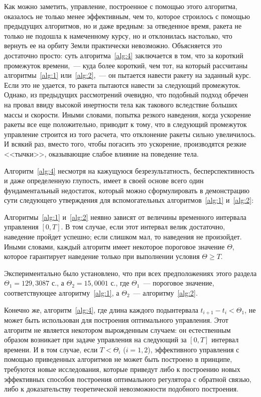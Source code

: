 Как можно заметить, управление, построенное с помощью этого алгоритма, оказалось не только менее эффективным, чем то, которое строилось с помощью предыдущих алгоритмов, но и даже вредным: за отведенное время, ракета не только не подошла к намеченному курсу, но и отклонилась настолько, что вернуть ее на орбиту Земли практически невозможно. Объясняется это достаточно просто: суть алгоритма~\ref{alg:4} заключается в том, что за короткий промежуток времени,~--- куда более короткий, чем тот, на который рассчитаны алгоритмы~\ref{alg:1} или~\ref{alg:2},~--- он пытается навести ракету на заданный курс. Если это не удается, то ракета пытаются навести за следующий промежуток. Однако, из предыдущих рассмотрений очевидно, что подобный подход обречен на провал ввиду высокой инертности тела как такового вследствие больших массы и скорости. Иными словами, попытка резкого наведения, когда ускорение ракеты все еще положительно, приводит к тому, что в следующий промежуток управление строится из того расчета, что отклонение ракеты сильно увеличилось. И всякий раз, вместо того, чтобы погасить это ускорение, производятся резкие <<тычки>>, оказывающие слабое влияние на поведение тела.

Алгоритм~\ref{alg:4} несмотря на кажущуюся безрезультатность, бесперспективность и даже определенную глупость, имеет в своей основе всего один фундаментальный недостаток, который можно сформулировать в демонстрацию сути следующего утверждения для вспомогательных алгоритмов~\ref{alg:1} и~\ref{alg:2}:

\begin{statement}
    Алгоритмы~\ref{alg:1} и~\ref{alg:2} неявно зависят от величины временного интервала управления $[0,T]$. В том случае, если этот интервал велик достаточно, наведение пройдет успешно; если слишком мал, то наведения не произойдет. Иными словами, каждый алгоритм имеет некоторое пороговое значение $\Theta$, которое гарантирует наведение только при выполнении условия $\Theta \geqslant T$.
\end{statement}

Экспериментально было установлено, что при всех предположениях этого раздела $\Theta_1=129,3087$ с., а $\Theta_2=15,0001$ с., где $\Theta_1$~--- пороговое значение, соответствующее алгоритму~\ref{alg:1}, а $\Theta_2$~--- алгоритму~\ref{alg:2}.

Конечно же, алгоритм~\ref{alg:4}, где длина каждого подынтервала $t_{i+1}-t_i < \Theta_1$, не может быть использован для построения оптимального управления. Этот алгоритм не является некотором вырожденным случаем: он естественным образом возникает при задаче управления на следующий за $[0,T]$ интервал времени. И в том случае, если $T<\Theta_i$ ($i=1,2$), эффективного управления с помощью приведенных алгоритмов не может быть построено в принципе, требуются новые исследования, которые приведут либо к построению новых эффективных способов построения оптимального регулятора с обратной связью, либо к доказательству теоретической невозможности подобного построения.

